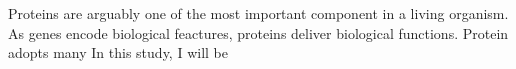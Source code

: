 Proteins are arguably one of the most important component in a living organism. As genes encode biological feactures, proteins deliver biological functions. Protein adopts  many  In this study, I will be 
